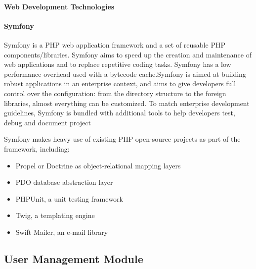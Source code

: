 \documentclass{article}
\begin{document}
			\paragraph{Web Development Technologies}
				\paragraph{Symfony \newline}	
					 Symfony is a PHP web application framework and a set of reusable PHP components/libraries.
					Symfony aims to speed up the creation and maintenance of web applications and to 
					replace repetitive coding tasks.
					Symfony has a low performance overhead used with a bytecode cache.Symfony is aimed at building robust applications in an enterprise context, and aims to
					 give developers full control over the configuration: from the directory structure to the
					  foreign libraries, almost everything can be customized. To match enterprise
					   development guidelines, Symfony is bundled with additional tools to help developers test, debug 
					  and document project
					  
					  Symfony makes heavy use of existing PHP open-source projects as part of the framework, including:
					  \begin{itemize}
					  	\item Propel or Doctrine as object-relational mapping layers
					  	\item PDO database abstraction layer 
					  	\item PHPUnit, a unit testing framework
					  	\item Twig, a templating engine
					  	\item Swift Mailer, an e-mail library
					  \end{itemize}
					  
				

	\subsection{User Management Module}
\end{document}
